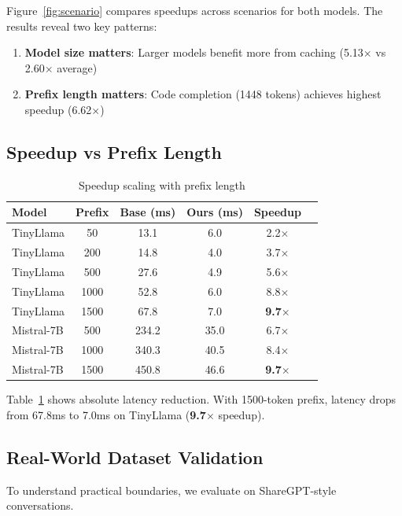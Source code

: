 \documentclass{article}
\begin{document}
Figure~\ref{fig:scenario} compares speedups across scenarios for both models.
The results reveal two key patterns:
\begin{enumerate}
    \item \textbf{Model size matters}: Larger models benefit more from caching (5.13$\times$ vs 2.60$\times$ average)
    \item \textbf{Prefix length matters}: Code completion (1448 tokens) achieves highest speedup (6.62$\times$)
\end{enumerate}

\subsection{Speedup vs Prefix Length}

\begin{table}[t]
\centering
\caption{Speedup scaling with prefix length}
\label{tab:speedup_scaling}
\small
\begin{tabular}{lccccc}
\toprule
Model & Prefix & Base (ms) & Ours (ms) & Speedup \\
\midrule
TinyLlama & 50 & 13.1 & 6.0 & 2.2$\times$ \\
TinyLlama & 200 & 14.8 & 4.0 & 3.7$\times$ \\
TinyLlama & 500 & 27.6 & 4.9 & 5.6$\times$ \\
TinyLlama & 1000 & 52.8 & 6.0 & 8.8$\times$ \\
TinyLlama & 1500 & 67.8 & 7.0 & \textbf{9.7$\times$} \\
\midrule
Mistral-7B & 500 & 234.2 & 35.0 & 6.7$\times$ \\
Mistral-7B & 1000 & 340.3 & 40.5 & 8.4$\times$ \\
Mistral-7B & 1500 & 450.8 & 46.6 & \textbf{9.7$\times$} \\
\bottomrule
\end{tabular}
\end{table}

Table~\ref{tab:speedup_scaling} shows absolute latency reduction.
With 1500-token prefix, latency drops from 67.8ms to 7.0ms on TinyLlama (\textbf{9.7$\times$} speedup).

\subsection{Real-World Dataset Validation}

To understand practical boundaries, we evaluate on ShareGPT-style conversations.
\end{document}
